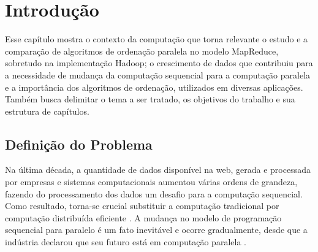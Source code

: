 \chapter{Introdução}
\label{cap:introducao}


Esse capítulo mostra o contexto da computação que torna relevante o estudo e a comparação de algoritmos de ordenação paralela no modelo MapReduce, sobretudo na implementação Hadoop; o crescimento de dados que contribuiu para a necessidade de mudança da computação sequencial para a computação paralela e a importância dos algoritmos de ordenação, utilizados em diversas aplicações. Também busca delimitar o tema a ser tratado, os objetivos do trabalho e sua estrutura de capítulos.  


%


\section{Definição do Problema}

%
%

Na última década, a quantidade de dados  disponível na web, gerada e processada por empresas e sistemas computacionais aumentou várias ordens de grandeza, fazendo do processamento dos dados um desafio para a computação sequencial. Como resultado, torna-se crucial substituir a computação tradicional por computação distribuída eficiente \cite{Lin:2010}. A mudança no modelo de programação sequencial para paralelo é um fato inevitável e ocorre gradualmente, desde que a indústria declarou que seu futuro está em computação paralela \cite{Asanovic:2009}.

